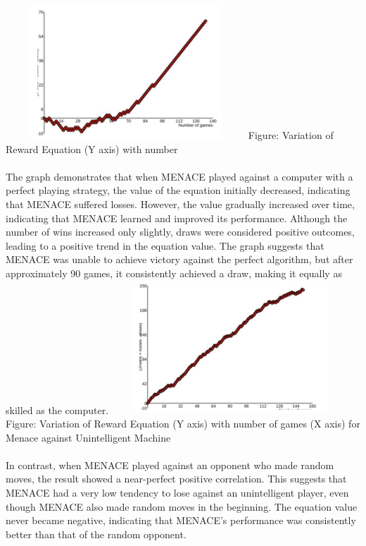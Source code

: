\documentclass[letterpaper, 12 pt, conference]{IEEEtran}
\begin{document}
\includegraphics[width=9cm, height=5cm]{1.png}
Figure: Variation of Reward Equation (Y axis) with number\\\\
The graph demonstrates that when MENACE played against a computer with a perfect playing strategy, the value of the equation initially decreased, indicating that MENACE suffered losses. However, the value gradually increased over time, indicating that MENACE learned and improved its performance. Although the number of wins increased only slightly, draws were considered positive outcomes, leading to a positive trend in the equation value. The graph suggests that MENACE was unable to achieve victory against the perfect algorithm, but after approximately 90 games, it consistently achieved a draw, making it equally as skilled as the computer.
\includegraphics[width=9cm, height=5cm]{2.png}
Figure: Variation of Reward Equation (Y axis) with number
of games (X axis) for Menace against Unintelligent
Machine\\\\
In contrast, when MENACE played against an opponent who made random moves, the result showed a near-perfect positive correlation. This suggests that MENACE had a very low tendency to lose against an unintelligent player, even though MENACE also made random moves in the beginning. The equation value never became negative, indicating that MENACE's performance was consistently better than that of the random opponent.
\end{document}
